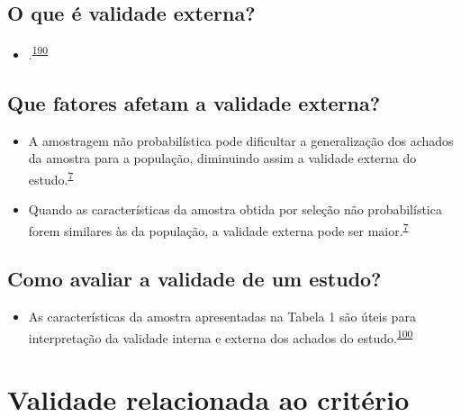 \documentclass[
  a4paper,
]{book}
\providecommand{\tightlist}{%
  \setlength{\itemsep}{0pt}\setlength{\parskip}{0pt}}
\begin{document}
\hypertarget{o-que-uxe9-validade-externa}{%
\subsection{O que é validade externa?}\label{o-que-uxe9-validade-externa}}

\begin{itemize}
\tightlist
\item
  .\textsuperscript{\protect\hyperlink{ref-findley2021}{190}}
\end{itemize}

\hypertarget{que-fatores-afetam-a-validade-externa}{%
\subsection{Que fatores afetam a validade externa?}\label{que-fatores-afetam-a-validade-externa}}

\begin{itemize}
\item
  A amostragem não probabilística pode dificultar a generalização dos achados da amostra para a população, diminuindo assim a validade externa do estudo.\textsuperscript{\protect\hyperlink{ref-Banerjee2010}{7}}
\item
  Quando as características da amostra obtida por seleção não probabilística forem similares às da população, a validade externa pode ser maior.\textsuperscript{\protect\hyperlink{ref-Banerjee2010}{7}}
\end{itemize}

\hypertarget{como-avaliar-a-validade-de-um-estudo}{%
\subsection{Como avaliar a validade de um estudo?}\label{como-avaliar-a-validade-de-um-estudo}}

\begin{itemize}
\tightlist
\item
  As características da amostra apresentadas na Tabela 1 são úteis para interpretação da validade interna e externa dos achados do estudo.\textsuperscript{\protect\hyperlink{ref-Westreich2013}{100}}
\end{itemize}

\hypertarget{validade-criterio}{%
\section{Validade relacionada ao critério}\label{validade-criterio}}
\end{document}
